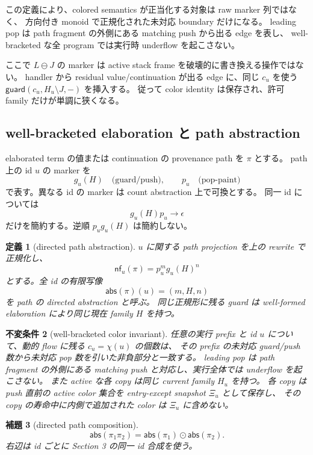 \documentclass[uplatex,dvipdfmx,a4paper,10.5pt]{jsarticle}
\theoremstyle{jpplain}
\newtheorem{definition}{定義}[section]
\newtheorem{lemma}[definition]{補題}
\newtheorem{invariant}[definition]{不変条件}
\newcommand{\guard}{\mathsf{guard}}
\newcommand{\abs}{\mathsf{abs}}
\newcommand{\nf}{\mathsf{nf}}
\begin{document}
この定義により、colored semantics が正当化する対象は raw marker 列ではなく、
方向付き monoid で正規化された未対応 boundary だけになる。
leading pop は path fragment の外側にある matching push から出る edge を表し、
well-bracketed な全 program では実行時 underflow を起こさない。

ここで $L\ominus J$ の marker は active stack frame を破壊的に書き換える操作ではない。
handler から residual value/continuation が出る edge に、同じ $c_u$ を使う
$\guard(c_u,H_u\setminus J,-)$ を挿入する。
従って color identity は保存され、許可 family だけが単調に狭くなる。

\subsection{well-bracketed elaboration と path abstraction}

elaborated term の値または continuation の provenance path を $\pi$ とする。
path 上の id $u$ の marker を
\[
  g_u(H)\quad\text{(guard/push)},
  \qquad
  p_u\quad\text{(pop-paint)}
\]
で表す。異なる id の marker は count abstraction 上で可換とする。
同一 id については
\[
  g_u(H)p_u\longrightarrow\epsilon
\]
だけを簡約する。逆順 $p_ug_u(H)$ は簡約しない。

\begin{definition}[directed path abstraction]
$u$ に関する path projection を上の rewrite で正規化し、
\[
  \nf_u(\pi)=p_u^m g_u(H)^n
\]
とする。全 id の有限写像
\[
  \abs(\pi)(u)=(m,H,n)
\]
を path の directed abstraction と呼ぶ。
同じ正規形に残る guard は well-formed elaboration により同じ現在 family $H$ を持つ。
\end{definition}

\begin{invariant}[well-bracketed color invariant]\label{inv:color-bracket}
任意の実行 prefix と id $u$ について、動的 flow に残る $c_u=\chi(u)$ の個数は、
その prefix の未対応 guard/push 数から未対応 pop 数を引いた非負部分と一致する。
leading pop は path fragment の外側にある matching push と対応し、実行全体では underflow を起こさない。
また active な各 copy は同じ current family $H_u$ を持つ。
各 copy は push 直前の active color 集合を entry-except snapshot $\Xi_u$ として保存し、
その copy の寿命中に内側で追加された color は $\Xi_u$ に含めない。
\end{invariant}

\begin{lemma}[directed path composition]\label{lem:path-compose}
\[
  \abs(\pi_1\pi_2)=\abs(\pi_1)\odot\abs(\pi_2).
\]
右辺は id ごとに Section 3 の同一 id 合成を使う。
\end{lemma}
\end{document}

